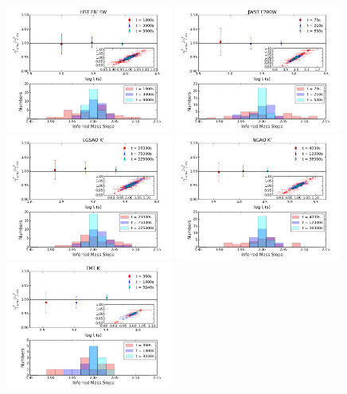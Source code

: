\documentclass[a4paper,11pt]{article}
\begin{document}
{%
\begin{figure}
\begin{center}
\includegraphics[width=0.49\textwidth]{figures/gamma_hist_135949_4QSO_HST.png}
\includegraphics[width=0.49\textwidth]{figures/gamma_hist_135949_4QSO_JWST.png} \\
\includegraphics[width=0.49\textwidth]{figures/gamma_hist_135949_4QSO_Keck.png}
\includegraphics[width=0.49\textwidth]{figures/gamma_hist_135949_4QSO_NGAO.png} \\
\includegraphics[width=0.49\textwidth]{figures/gamma_hist_135949_4QSO_TMT.png}

\end{center}
\end{figure}}
\end{document}
